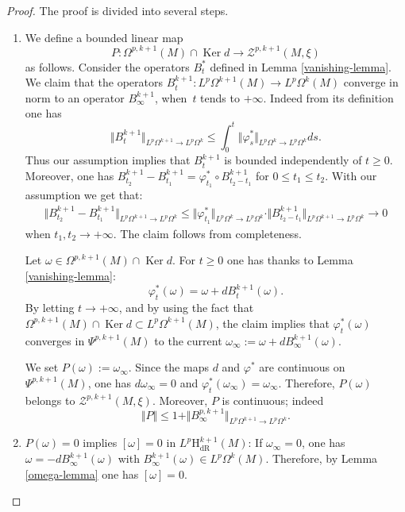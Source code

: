 \documentclass[JEP,XML,SOM,Unicode,published]{cedram}
\newcommand{\dR}{\mathrm{dR}}
\newcommand{\rH}{\mathrm{H}}
\theoremstyle{plain}
\theoremstyle{remark}
\theoremstyle{definition}
\DeclareMathOperator{\Ker}{Ker}
\begin{document}
\begin{proof} The proof is divided into several steps.

\begin{enumerate}
\item\label{pf:current-proposition1}
We define a bounded linear map
\[P: \Omega^{p, k+1}(M) \cap \Ker d \to \mathcal Z^{p,k+1} (M, \xi)\]
as follows.
Consider the operators $B^*_t$ defined in Lemma \ref{vanishing-lemma}.
We claim that the operators $B_t^{k+1}: L^p \Omega^{ k+1}(M) \to L^p \Omega^k(M)$ converge in norm to an operator
$B_\infty^{k+1}$, when~$t$ tends to $+\infty$.
Indeed from its definition one has
\[\Vert B_t^{k+1} \Vert_{L^p \Omega^{k+1} \to L^p \Omega^k} \leqslant \int_0^t \Vert \varphi^*_s \Vert_{L^p \Omega^k \to L^p \Omega^k} ds.\]
Thus our assumption implies that $B_t^{k+1}$ is bounded independently of $t \geqslant 0$.
Moreover, one has $B_{t_2}^{k+1} - B_{t_1}^{k+1}= \varphi^*_{t_1} \circ B_{t_2- t_1}^{k+1}$ for $0\leqslant t_1 \leqslant t_2$.
With our assumption we get that:
\begin{align*}
\Vert B_{t_2}^{k+1} - B_{t_1}^{k+1} \Vert_{ L^p \Omega^{ k+1} \to L^p \Omega^k} \leqslant
\Vert \varphi_{t_1}^* \Vert_{L^p \Omega^k \to L^p \Omega^k} \cdot \Vert B_{t_2-t_1}^{k+1} \Vert_{ L^p \Omega^{ k+1} \to L^p \Omega^k}
\to 0
\end{align*}
when $t_1, t_2 \to +\infty$. The claim follows from completeness.

Let $\omega \in \Omega^{p, k+1}(M) \cap \Ker d$.
For $t \geqslant 0$ one has thanks to Lemma \ref{vanishing-lemma}:
\[\varphi_t^* (\omega) = \omega + dB_t^{k+1} (\omega).\]
By letting $t \to +\infty$, and by using the fact that $\Omega^{p, k+1}(M) \cap \Ker d \subset L^p \Omega^{ k+1}(M)$, the claim implies that $\varphi_t^* (\omega)$ converges in $\Psi^{p, k+1}(M)$ to
the current $\omega_\infty:= \omega + d B_\infty^{k+1} (\omega)$.

We set $P(\omega):= \omega_\infty$. Since the maps $d$ and $\varphi^*$ are continuous on
$\Psi^{p, k+1} (M)$, one has $d \omega_\infty =0$ and $\varphi_t^* (\omega_\infty) = \omega_\infty$.
Therefore, $P(\omega)$ belongs to $\mathcal Z^{p,k+1} (M, \xi)$. Moreover, $P$ is continuous; indeed
\[\Vert P \Vert \leqslant 1+ \Vert B^{p, k+1}_\infty \Vert_{L^p \Omega^{k+1} \to L^p \Omega^k}.\]

\item\label{pf:current-proposition2}
$P(\omega) =0$ implies $[\omega] =0$ in $L^p \rH_\dR^{k+1} (M)$:
If $\omega_\infty =0$, one has $\omega = - d B_\infty^{k+1} (\omega)$
with $B_\infty^{k+1} (\omega) \in L^p \Omega^{k}(M)$. Therefore, by Lemma \ref{omega-lemma} one has $[\omega] =0$.


\end{enumerate}
\end{proof}
\end{document}
